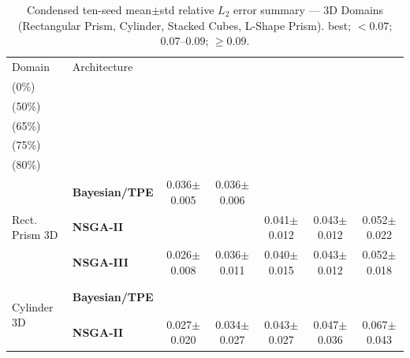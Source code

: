 \begin{table}[H]
\centering\small\setlength{\tabcolsep}{4pt}
\caption{Condensed ten-seed mean$\pm$std relative $L_2$ error summary --- 3D Domains (Rectangular Prism, Cylinder, Stacked Cubes, L-Shape Prism).
\phantom{x} best; \phantom{x} ${<}0.07$;
\phantom{x} $0.07$--$0.09$; \phantom{x} ${\geq}0.09$.}
\label{tab:l2_summary_3d}
\begin{tabular}{@{}llccccc@{}}
\toprule
Domain & Architecture & \makecell{$k{=}1$\\(0\%)} & \makecell{$k{=}2$\\(50\%)} & \makecell{$k{=}3$\\(65\%)} & \makecell{$k{=}4$\\(75\%)} & \makecell{$k{=}5$\\(80\%)} \\
\midrule
\multirow{3}{*}{Rect. Prism 3D}
  & \textbf{Bayesian/TPE} & \cellcolor{ForestGreen!25}0.036$\pm$0.005 & \cellcolor{ForestGreen!25}0.036$\pm$0.006 & \cellcolor{ForestGreen!55}\textcolor{white}{\textbf{0.036$\pm$0.008}} & \cellcolor{ForestGreen!55}\textcolor{white}{\textbf{0.037$\pm$0.007}} & \cellcolor{ForestGreen!55}\textcolor{white}{\textbf{0.037$\pm$0.008}} \\
  & \textbf{NSGA-II} & \cellcolor{ForestGreen!55}\textcolor{white}{\textbf{0.024$\pm$0.006}} & \cellcolor{ForestGreen!55}\textcolor{white}{\textbf{0.032$\pm$0.010}} & \cellcolor{ForestGreen!25}0.041$\pm$0.012 & \cellcolor{ForestGreen!25}0.043$\pm$0.012 & \cellcolor{ForestGreen!25}0.052$\pm$0.022 \\
  & \textbf{NSGA-III} & \cellcolor{ForestGreen!25}0.026$\pm$0.008 & \cellcolor{ForestGreen!25}0.036$\pm$0.011 & \cellcolor{ForestGreen!25}0.040$\pm$0.015 & \cellcolor{ForestGreen!25}0.043$\pm$0.012 & \cellcolor{ForestGreen!25}0.052$\pm$0.018 \\
\midrule
\multirow{3}{*}{Cylinder 3D}
  & \textbf{Bayesian/TPE} & \cellcolor{ForestGreen!55}\textcolor{white}{\textbf{0.024$\pm$0.006}} & \cellcolor{ForestGreen!55}\textcolor{white}{\textbf{0.026$\pm$0.005}} & \cellcolor{ForestGreen!55}\textcolor{white}{\textbf{0.028$\pm$0.004}} & \cellcolor{ForestGreen!55}\textcolor{white}{\textbf{0.032$\pm$0.004}} & \cellcolor{ForestGreen!55}\textcolor{white}{\textbf{0.036$\pm$0.005}} \\
  & \textbf{NSGA-II} & \cellcolor{ForestGreen!25}0.027$\pm$0.020 & \cellcolor{ForestGreen!25}0.034$\pm$0.027 & \cellcolor{ForestGreen!25}0.043$\pm$0.027 & \cellcolor{ForestGreen!25}0.047$\pm$0.036 & \cellcolor{ForestGreen!25}0.067$\pm$0.043 \\

\end{tabular}
\end{table}

